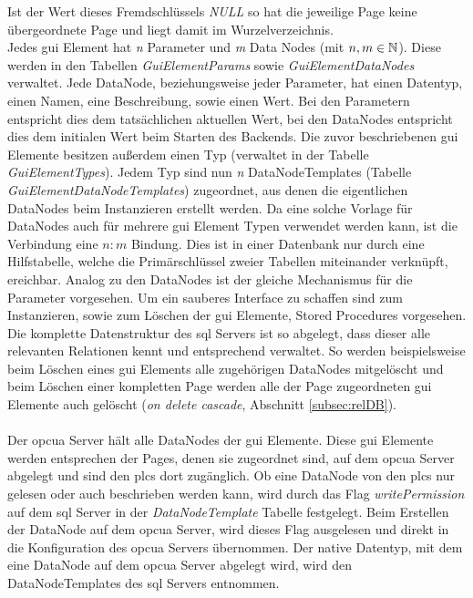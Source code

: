 Ist der Wert dieses Fremdschlüssels \emph{NULL} so hat die jeweilige Page keine übergeordnete Page und liegt damit im Wurzelverzeichnis.\\
Jedes \ac{gui} Element hat \emph{n} Parameter und \emph{m} Data Nodes (mit $ n, m \in \mathbb{N} $). 
Diese werden in den Tabellen \emph{GuiElementParams} sowie \emph{GuiElementDataNodes} verwaltet.
Jede DataNode, beziehungsweise jeder Parameter, hat einen Datentyp, einen Namen, eine Beschreibung, sowie einen Wert. 
Bei den Parametern entspricht dies dem tatsächlichen aktuellen Wert, 
bei den DataNodes entspricht dies dem initialen Wert beim Starten des Backends.
Die zuvor beschriebenen \ac{gui} Elemente besitzen außerdem einen Typ (verwaltet in der Tabelle \emph{GuiElementTypes}).
Jedem Typ sind nun \emph{n} DataNodeTemplates (Tabelle \emph{GuiElementDataNodeTemplates}) zugeordnet, 
aus denen die eigentlichen DataNodes beim Instanzieren erstellt werden. Da eine solche Vorlage für DataNodes auch für mehrere \ac{gui} Element Typen verwendet werden kann, 
ist die Verbindung eine $n:m$ Bindung. 
Dies ist in einer Datenbank nur durch eine Hilfstabelle, 
welche die Primärschlüssel zweier Tabellen miteinander verknüpft, ereichbar. 
Analog zu den DataNodes ist der gleiche Mechanismus für die Parameter vorgesehen.
Um ein sauberes Interface zu schaffen sind zum Instanzieren, 
sowie zum Löschen der \ac{gui} Elemente, Stored Procedures vorgesehen.
Die komplette Datenstruktur des \ac{sql} Servers ist so abgelegt, 
dass dieser alle relevanten Relationen kennt und entsprechend verwaltet.
So werden beispielsweise beim Löschen eines \ac{gui} Elements alle zugehörigen DataNodes mitgelöscht und 
beim Löschen einer kompletten Page werden alle der Page zugeordneten \ac{gui} Elemente auch gelöscht (\emph{on delete cascade}, Abschnitt \ref{subsec:relDB}).\\ \\

Der \ac{opcua} Server hält alle DataNodes der \ac{gui} Elemente. 
Diese \ac{gui} Elemente werden entsprechen der Pages, denen sie zugeordnet sind, auf dem \ac{opcua} Server abgelegt und 
sind den \acp{plc} dort zugänglich.
Ob eine DataNode von den \acp{plc} nur gelesen oder auch beschrieben werden kann, 
wird durch das Flag \emph{writePermission} auf dem \ac{sql} Server in der \emph{DataNodeTemplate} Tabelle festgelegt. 
Beim Erstellen der DataNode auf dem \ac{opcua} Server, wird dieses Flag ausgelesen und 
direkt in die Konfiguration des \ac{opcua} Servers übernommen.
Der native Datentyp, mit dem eine DataNode auf dem \ac{opcua} Server abgelegt wird, wird den DataNodeTemplates des \ac{sql} Servers entnommen.

